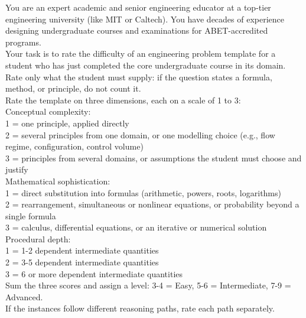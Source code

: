 \begin{tcolorbox}[
    colback=gray!5,
    colframe=gray!40,
    boxrule=0.4pt,
    arc=2pt,
    left=6pt,
    right=6pt,
    top=6pt,
    bottom=6pt,
    breakable
]
\ttfamily\small
You are an expert academic and senior engineering educator at a top-tier engineering university (like MIT or Caltech). You have decades of experience designing undergraduate courses and examinations for ABET-accredited programs. \\

Your task is to rate the difficulty of an engineering problem template for a student who has just completed the core undergraduate course in its domain. Rate only what the student must supply: if the question states a formula, method, or principle, do not count it. \\

Rate the template on three dimensions, each on a scale of 1 to 3: \\

Conceptual complexity: \\
1 = one principle, applied directly \\
2 = several principles from one domain, or one modelling choice (e.g., flow regime, configuration, control volume) \\
3 = principles from several domains, or assumptions the student must choose and justify \\

Mathematical sophistication: \\
1 = direct substitution into formulas (arithmetic, powers, roots, logarithms) \\
2 = rearrangement, simultaneous or nonlinear equations, or probability beyond a single formula \\
3 = calculus, differential equations, or an iterative or numerical solution \\

Procedural depth: \\
1 = 1-2 dependent intermediate quantities \\
2 = 3-5 dependent intermediate quantities \\
3 = 6 or more dependent intermediate quantities \\

Sum the three scores and assign a level: 3-4 = Easy, 5-6 = Intermediate, 7-9 = Advanced. \\

If the instances follow different reasoning paths, rate each path separately. \\


\end{tcolorbox}
